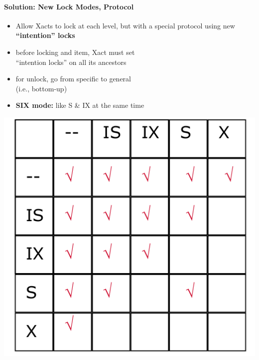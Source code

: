 \paragraph{Solution: New Lock Modes, Protocol}

\begin{minipage}{0.3\textwidth}
  \begin{itemize}
  \item Allow Xacts to lock at each level, but with a
    special protocol using new \textbf{``intention'' locks}
  \item before locking and item, Xact must set \\
    ``intention locks'' on all its ancestors
  \item for unlock, go from specific to general \\
    (i.e., bottom-up)
  \item \textbf{SIX mode:} like S \& IX at the same time
  \end{itemize}
\end{minipage}%
\begin{minipage}{0.5\textwidth}
  \includegraphics[scale=0.15]{graphics/intention-locks.png}
\end{minipage}


